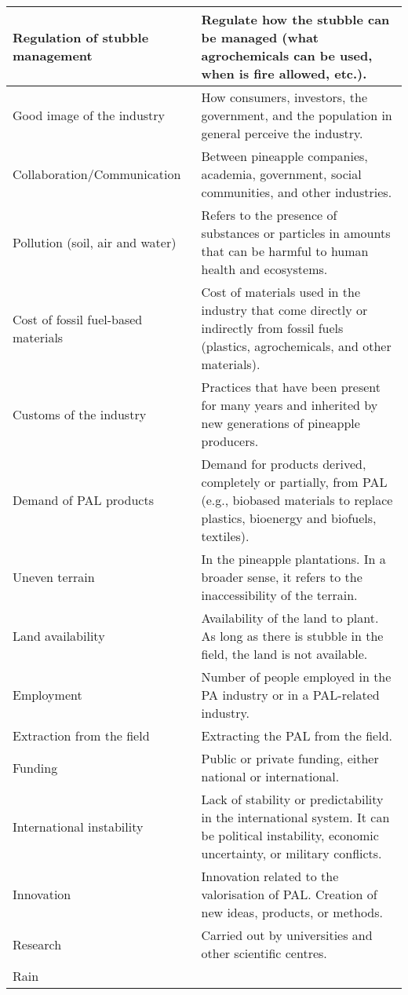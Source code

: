 \begin{xltabular}{\textwidth}{XX}
Regulation of stubble management &
  Regulate how the stubble can be managed (what agrochemicals can be used,  when is fire allowed, etc.). \\ \hline
Good image of the industry &
  How consumers, investors, the government, and the population in general perceive the industry. \\ \hline
Collaboration/Communication &
  Between pineapple companies, academia, government, social communities, and other industries. \\ \hline
Pollution (soil, air and water) &
  Refers to the presence of substances or particles in amounts that can be harmful to human health and ecosystems. \\ \hline
Cost of fossil fuel-based materials &
  Cost of materials used in the industry that come directly or indirectly from fossil fuels (plastics, agrochemicals, and other materials). \\ \hline
Customs of the industry &
  Practices that have been present for many years and inherited by new generations of pineapple producers. \\ \hline
Demand of PAL products &
  Demand for products derived, completely or partially, from PAL (e.g., biobased materials to replace plastics, bioenergy and biofuels, textiles). \\ \hline
Uneven terrain &
  In the pineapple plantations. In a broader sense, it refers to the inaccessibility of the terrain. \\ \hline
Land availability &
  Availability of the land to plant. As long as there is stubble in the field, the land is not available. \\ \hline
Employment &
  Number of people employed in the PA industry or in a PAL-related industry. \\ \hline
Extraction from the field &
  Extracting the PAL from the field. \\ \hline
Funding &
  Public or private funding, either national or international. \\ \hline
International instability &
  Lack of stability or predictability in the international system. It can be political instability, economic uncertainty, or military conflicts. \\ \hline
Innovation &
  Innovation related to the valorisation of PAL. Creation of new ideas, products, or methods. \\ \hline
Research &
  Carried out by universities and other scientific centres. \\ \hline
Rain &

\end{xltabular}
